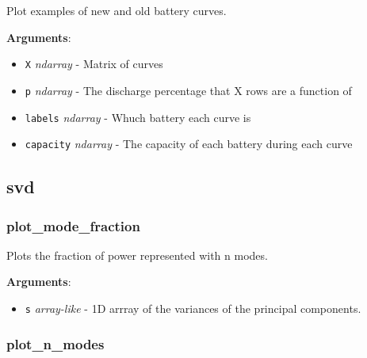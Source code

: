 \begin{Shaded}
\begin{Highlighting}[]
\end{Highlighting}
\end{Shaded}

Plot examples of new and old battery curves.

\textbf{Arguments}:

\begin{itemize}
\tightlist
\item
  \texttt{X} \emph{ndarray} - Matrix of curves
\item
  \texttt{p} \emph{ndarray} - The discharge percentage that X rows are a
  function of
\item
  \texttt{labels} \emph{ndarray} - Whuch battery each curve is
\item
  \texttt{capacity} \emph{ndarray} - The capacity of each battery during
  each curve
\end{itemize}

\subsection{svd}

\subsubsection{plot\_mode\_fraction}

\begin{Shaded}
\begin{Highlighting}[]
\end{Highlighting}
\end{Shaded}

Plots the fraction of power represented with n modes.

\textbf{Arguments}:

\begin{itemize}
\tightlist
\item
  \texttt{s} \emph{array-like} - 1D arrray of the variances of the
  principal components.
\end{itemize}

\subsubsection{plot\_n\_modes}

\begin{Shaded}
\begin{Highlighting}[]
\end{Highlighting}
\end{Shaded}

